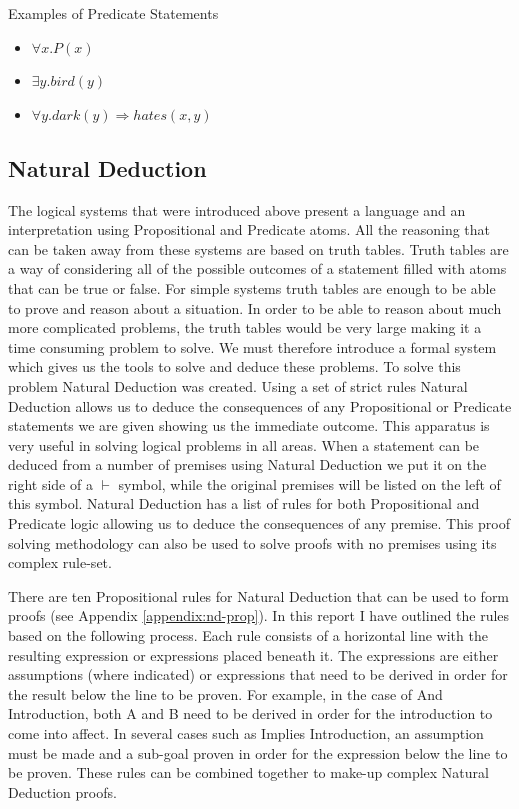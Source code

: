 \begin{exmp}Examples of Predicate Statements
\begin{itemize}
\item $\forall x.P(x)$
\item $\exists y.bird(y)$
\item $\forall y.dark(y) \Rightarrow hates(x,y)$
\end{itemize}
\end{exmp}

\subsection{Natural Deduction}

The logical systems that were introduced above present a language and an interpretation using Propositional and Predicate atoms. All the reasoning that can be taken away from these systems are based on truth tables. Truth tables are a way of considering all of the possible outcomes of a statement filled with atoms that can be true or false. For simple systems truth tables are enough to be able to prove and reason about a situation. In order to be able to reason about much more complicated problems, the truth tables would be very large making it a time consuming problem to solve. We must therefore introduce a formal system which gives us the tools to solve and deduce these problems. To solve this problem Natural Deduction was created. Using a set of strict rules Natural Deduction allows us to deduce the consequences of any Propositional or Predicate statements we are given showing us the immediate outcome. This apparatus is very useful in solving logical problems in all areas. When a statement can be deduced from a number of premises using Natural Deduction we put it on the right side of a $\vdash$ symbol, while the original premises will be listed on the left of this symbol. Natural Deduction has a list of rules for both Propositional and Predicate logic allowing us to deduce the consequences of any premise. This proof solving methodology can also be used to solve proofs with no premises using its complex rule-set.

There are ten Propositional rules for Natural Deduction that can be used to form proofs (see Appendix \ref{appendix:nd-prop}). In this report I have outlined the rules based on the following process. Each rule consists of a horizontal line with the resulting expression or expressions placed beneath it. The expressions are either assumptions (where indicated) or expressions that need to be derived in order for the result below the line to be proven. For example, in the case of And Introduction, both A and B need to be derived in order for the introduction to come into affect. In several cases such as Implies Introduction, an assumption must be made and a sub-goal proven in order for the expression below the line to be proven. These rules can be combined together to make-up complex Natural Deduction proofs.


